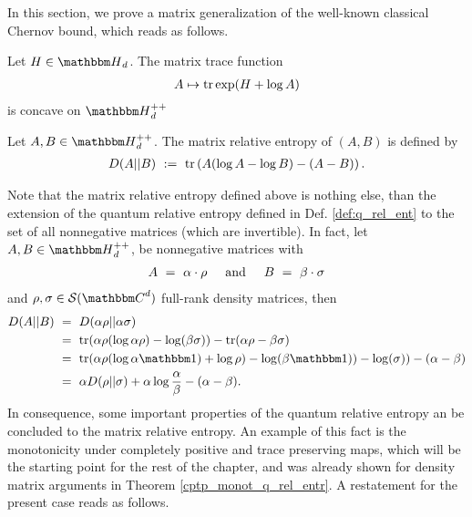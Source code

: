 In this section, we prove a matrix generalization of the well-known classical Chernov bound, which reads as follows.





\begin{theorem} \label{thm:lieb}
  Let $H \in \bbmH_d$. The matrix trace function
  \begin{align}
    A \mapsto \mathrm{tr} \exp(H+\log A)
  \end{align}
  is concave on $\bbmH_d^{++}$
\end{theorem}

\begin{definition} \label{def:matrix_rel_entropy}
  Let $A, B \in \bbmH_d^{++}$. The matrix relative entropy of $(A,B)$ is defined by
  \begin{align}
    D(A||B) \ := \ \mathrm{tr} \left(A(\log A - \log B) - (A-B) \right).
  \end{align}
\end{definition}

Note that the matrix relative entropy defined above is nothing else, than the extension of the quantum relative entropy defined in Def. \ref{def:q_rel_ent} to the set of all
nonnegative matrices (which are invertible). In fact, let $A, B \in \bbmH_d^{++}$, be nonnegative matrices with
\begin{align}
  A  \ = \ \alpha \cdot \rho \hspace{.5cm} \text{and} \hspace{.5cm} B  \ = \ \beta \cdot \sigma
\end{align}
and $\rho, \sigma \in \cS(\bbmC^d)$ full-rank density matrices, then
\begin{align}
  D(A||B) \  & = \ D(\alpha \rho|| \alpha \sigma)                                                                                                   \\
             & = \ \tr(\alpha \rho(\log \alpha \rho) - \log(\beta \sigma)) - \tr(\alpha \rho - \beta \sigma)                                        \\
             & = \ \tr(\alpha \rho(\log \alpha \bbmeins) + \log \rho) - \log(\beta \bbmeins)) - \log(\sigma)) - (\alpha - \beta)                    \\
             & = \ \alpha D(\rho|| \sigma) + \alpha \log \frac{\alpha}{\beta} - (\alpha - \beta).  \label{relation_matrix_quantum_relative_entropy}
\end{align}
In consequence, some important properties of the quantum relative entropy an be concluded to the matrix relative entropy. An example of this fact is the monotonicity under
completely positive and trace preserving maps, which will be the starting point for the rest of the chapter, and was already shown for density matrix arguments in Theorem
\ref{cptp_monot_q_rel_entr}. A restatement for the present case reads as follows.

